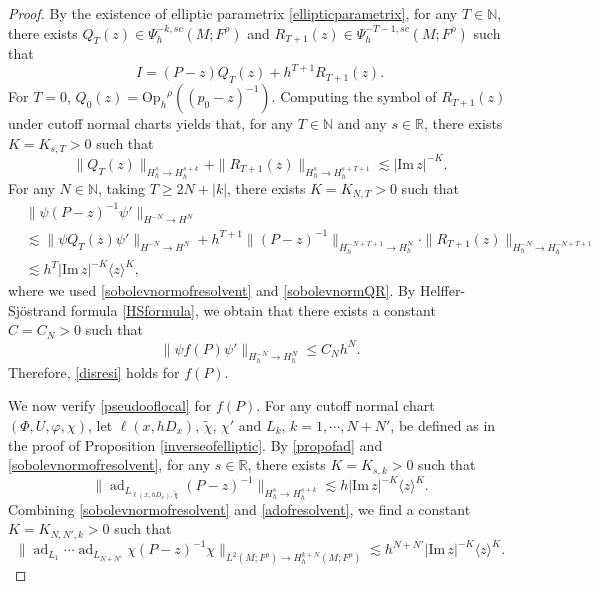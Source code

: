 \documentclass[11pt,oneside,reqno]{amsart}
\newcommand\N{\ensuremath{\mathbb{N}}}
\newcommand\R{\ensuremath{\mathbb{R}}}
\newcommand\Oph{\ensuremath{\mathrm{Op}_h}}
\theoremstyle{definition}
\numberwithin{equation}{section}
\theoremstyle{plain}
\begin{document}
\begin{proof}
By the existence of elliptic parametrix \eqref{ellipticparametrix}, for any $T\in \mathbb{N}$, there exists $Q_{T}(z) \in \Psi^{-k,sc}_{h}(M;F^\rho)$ and $R_{T+1}(z) \in \Psi^{-T-1,sc}_h(M;F^\rho)$ such that
\begin{equation*}
    I=(P-z)Q_{T}(z)+h^{T+1}R_{T+1}(z) .
\end{equation*}
For $T=0$, $Q_{0}(z)=\Oph^{\rho}((p_{0}-z)^{-1})$. Computing the symbol of $R_{T+1}(z)$ under cutoff normal charts yields that, for any $T\in \N$ and any $s\in \R$, there exists $K=K_{s,T}>0$ such that
\begin{equation}\label{sobolevnormQR}
\|Q_{T}(z)\|_{H^{s}_{h}\to H^{s+k}_{h}}  + \|R_{T+1}(z)\|_{H_{h}^{s}\to H^{s+T+1}_{h}} \lesssim |\mathrm{Im}\, z|^{-K}.
\end{equation}
For any $N\in \N$, taking $T\geq 2N+|k|$, there exists $K=K_{N,T}>0$ such that
\begin{equation}
\begin{aligned}
&\|\psi  (P-z)^{-1}\psi'\|_{H^{-N}\to H^{N}}\\
& \lesssim \|\psi  Q_{T}(z)\psi' \|_{H^{-N}\to H^{N}}+h^{T+1}\|(P-z)^{-1}\|_{H_{h}^{-N+T+1}\to  H_{h}^{N}}\cdot\|R_{T+1}(z)\|_{H^{-N}_h\to H^{-N+T+1}_h} \\
&\lesssim  h^{T}|\mathrm{Im}\, z|^{-K }\langle z\rangle^{K },
\end{aligned}
\end{equation}
where we used \eqref{sobolevnormofresolvent} and \eqref{sobolevnormQR}. By Helffer-Sjöstrand formula \eqref{HSformula}, we obtain that there exists a constant $C=C_N>0$ such that
\begin{equation}\label{cutoffoffp}
\|\psi f(P) \psi'\|_{H^{-N}_h\to H^N_h}\leq C_N h^N.
\end{equation}
Therefore, \eqref{disresi} holds for $f(P)$.

We now verify \eqref{pseudooflocal} for $f(P)$. For any cutoff normal chart $(\Phi, U,\varphi,\chi)$, let $\ell(x,hD_x),\, \widetilde{\chi}$, $\chi'$ and $ L_k$, $k=1,\cdots,N+N'$, be defined as in the proof of Proposition \ref{inverseofelliptic}. By \eqref{propofad} and \eqref{sobolevnormofresolvent}, for any $s\in \R$, there exists $K=K_{s,k}>0$ such that
\begin{equation}\label{adofresolvent}
 \big\|\operatorname{ad}_{L_{\ell(x,hD_x),\widetilde{\chi}}}(P-z)^{-1} \big\|_{H^{s}_{h}\to H^{s+k}_{h}} \lesssim h|\mathrm{Im}\, z|^{-K}\langle z \rangle^{K}.
\end{equation}
Combining \eqref{sobolevnormofresolvent} and \eqref{adofresolvent}, we find a constant $K=K_{N,N',k}>0$ such that
\begin{equation}\label{adestiP-z}
\big\|\operatorname{ad}_{L_{1}} \cdots \operatorname{ad}_{L_{N+N'}} \chi (P-z)^{-1}\chi \big\|_{L^2\left(M;F^\rho\right) \rightarrow H_h^{k+N}\left(M;F^{\rho}\right)} \lesssim h^{N+N'}|\mathrm{Im}\, z|^{-K}\langle z\rangle^{K} .
\end{equation}


\end{proof}
\end{document}
